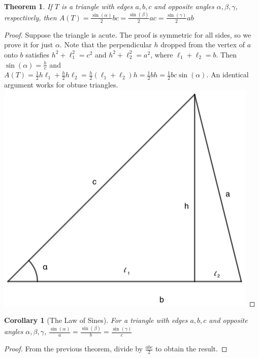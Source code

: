 \documentclass[12pt,oneside]{book}
\theoremstyle{mystyle}
\newtheorem{theorem}{Theorem}[section]
\newtheorem{corollary}{Corollary}[section]
\begin{document}
\begin{theorem}
If $T$ is a triangle with edges $a,b,c$ and opposite angles $\alpha,\beta,\gamma$, respectively, then $A(T) = \frac{\sin(\alpha)}{2}bc = \frac{\sin(\beta)}{2}ac = \frac{\sin(\gamma)}{2}ab$
\end{theorem}
\begin{proof}
Suppose the triangle is acute. The proof is symmetric for all sides, so we prove it for just $\alpha$. Note that the perpendicular $h$ dropped from the vertex of $a$ onto $b$ satisfies $h^2+\ell_1^2 = c^2$ and $h^2+\ell_2^2 = a^2$, where $\ell_1+\ell_2 = b$. Then $\sin(\alpha) = \frac{h}{c}$ and $A(T) = \frac{1}{2}h\ell_1 + \frac{h}{2}h\ell_2 = \frac{h}{2}(\ell_1+\ell_2)h = \frac{1}{2}bh = \frac{1}{2}bc\sin(\alpha)$. An identical argument works for obtuse triangles.
\includegraphics[scale=0.3]{triangle-1.png}
\end{proof}

\begin{corollary}[The Law of Sines]
For a triangle with edges $a,b,c$ and opposite angles $\alpha,\beta,\gamma$, $\frac{\sin(\alpha)}{a} = \frac{\sin(\beta)}{b} = \frac{\sin(\gamma)}{c}$
\end{corollary}
\begin{proof}
From the previous theorem, divide by $\frac{abc}{2}$ to obtain the result.
\end{proof}
\end{document}
